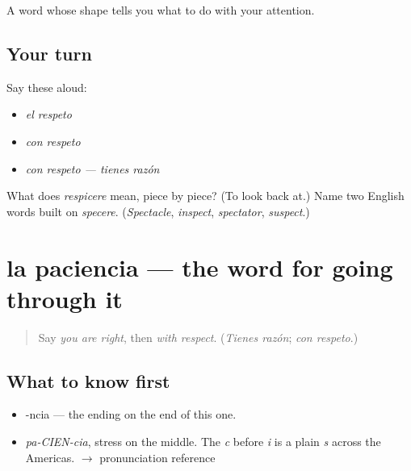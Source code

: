 \begin{grammarlens}[title={What you've built}]
A word whose shape tells you what to do with your attention.
\end{grammarlens}

\subsection*{Your turn}
Say these aloud:

\begin{itemize}
\raggedright
  \item \emph{el respeto}
  \item \emph{con respeto}
  \item \emph{con respeto — tienes razón}
\end{itemize}

\begin{tcolorbox}[breakable,colback=teal!4,colframe=teal!35!black,title={Before you move on}]
What does \emph{respicere} mean, piece by piece? (To look back at.) Name two English words built on \emph{specere}. (\emph{Spectacle}, \emph{inspect}, \emph{spectator}, \emph{suspect}.)
\end{tcolorbox}
\section[la paciencia]{la paciencia — the word for going through it}

\label{lesson:ES-C321-paciencia}



\begin{quote}
Say \emph{you are right}, then \emph{with respect}. (\emph{Tienes razón}; \emph{con respeto}.)
\end{quote}

\subsection*{What to know first}
\begin{itemize}
\raggedright
  \item -ncia — the ending on the end of this one.
\end{itemize}

\begin{sounds}
\begin{itemize}
\raggedright
  \item \emph{pa-CIEN-cia}, stress on the middle. The \emph{c} before \emph{i} is a plain \emph{s} across the Americas. $\to$ pronunciation reference
\end{itemize}
\end{sounds}

